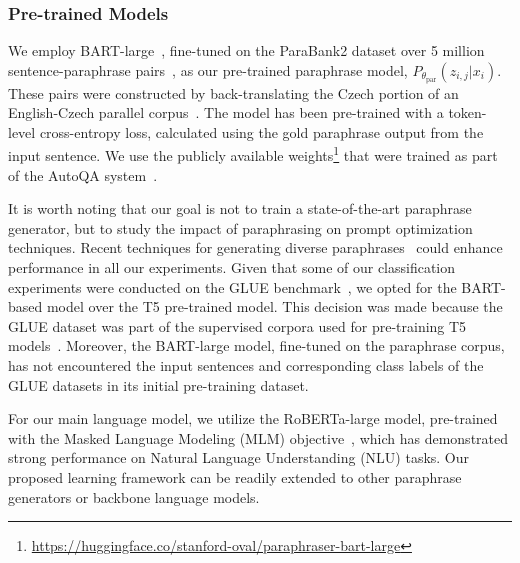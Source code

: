 \documentclass[11pt]{article}
\begin{document}
\subsubsection{Pre-trained Models}
We employ BART-large~\cite{lewis-etal-2020-bart}, fine-tuned on the ParaBank2 dataset over 5 million sentence-paraphrase pairs~\cite{hu-etal-2019-large}, as our pre-trained paraphrase model, $P_{\theta_{\text{par}}} (z_{i,j} | x_{i})$. These pairs were constructed by back-translating the Czech portion of an English-Czech parallel corpus~\cite{hu-etal-2019-large}. The model has been pre-trained with a token-level cross-entropy loss, calculated using the gold paraphrase output from the input sentence. We use the publicly available weights\footnote{\url{https://huggingface.co/stanford-oval/paraphraser-bart-large}} that were trained as part of the AutoQA system~\cite{xu-etal-2020-autoqa}.

It is worth noting that our goal is not to train a state-of-the-art paraphrase generator, but to study the impact of paraphrasing on prompt optimization techniques. Recent techniques for generating diverse paraphrases~\cite{zhou-bhat-2021-paraphrase} could enhance performance in all our experiments. Given that some of our classification experiments were conducted on the GLUE benchmark~\cite{DBLP:journals/corr/abs-1804-07461}, we opted for the BART-based model over the T5 pre-trained model. This decision was made because the GLUE dataset was part of the supervised corpora used for pre-training T5 models~\cite{DBLP:journals/corr/abs-1910-10683}. Moreover, the BART-large model, fine-tuned on the paraphrase corpus, has not encountered the input sentences and corresponding class labels of the GLUE datasets in its initial pre-training dataset.

For our main language model, we utilize the RoBERTa-large model, pre-trained with the Masked Language Modeling (MLM) objective~\cite{DBLP:journals/corr/abs-1907-11692}, which has demonstrated strong performance on Natural Language Understanding (NLU) tasks. Our proposed learning framework can be readily extended to other paraphrase generators or backbone language models.
\end{document}
